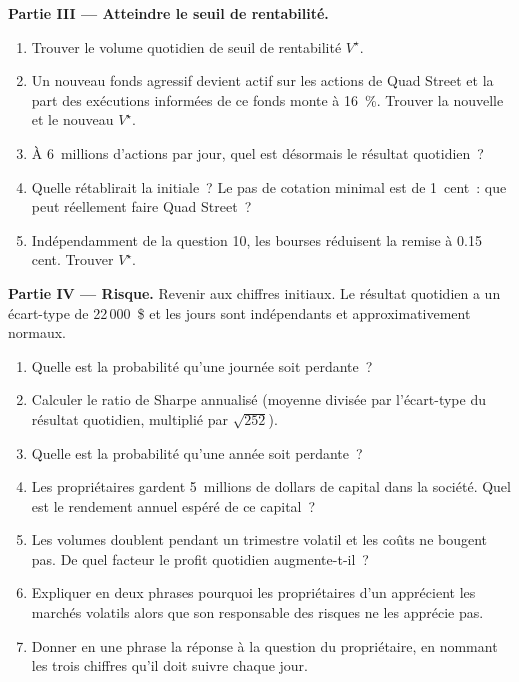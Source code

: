 \begin{problem}
\medskip\noindent\textbf{Partie III --- Atteindre le seuil de rentabilité.}
\begin{enumerate}[resume]
\item Trouver le volume quotidien de seuil de rentabilité $V^\star$.
\item Un nouveau fonds agressif devient actif sur les actions de Quad Street et la
part des exécutions informées de ce fonds monte à 16~\%. Trouver la nouvelle  et le
nouveau $V^\star$.
\item À 6~millions d'actions par jour, quel est désormais le résultat quotidien~?
\item Quelle  rétablirait la  initiale~? Le pas de cotation minimal
est de 1~cent~: que peut réellement faire Quad Street~?
\item Indépendamment de la question 10, les bourses réduisent la remise à 0.15
cent. Trouver $V^\star$.
\end{enumerate}

\medskip\noindent\textbf{Partie IV --- Risque.} Revenir aux chiffres initiaux.
Le résultat quotidien a un écart-type de 22\,000~\$ et les jours sont
indépendants et approximativement normaux.
\begin{enumerate}[resume]
\item Quelle est la probabilité qu'une journée soit perdante~?
\item Calculer le ratio de Sharpe annualisé (moyenne divisée par l'écart-type du
résultat quotidien, multiplié par $\sqrt{252}$).
\item Quelle est la probabilité qu'une année soit perdante~?
\item Les propriétaires gardent 5~millions de dollars de capital dans la société. Quel est le
rendement annuel espéré de ce capital~?
\item Les volumes doublent pendant un trimestre volatil et les coûts ne bougent pas. De quel
facteur le profit quotidien augmente-t-il~?
\item Expliquer en deux phrases pourquoi les propriétaires d'un  apprécient les marchés volatils
alors que son responsable des risques ne les apprécie pas.
\item Donner en une phrase la réponse à la question du propriétaire, en nommant les
trois chiffres qu'il doit suivre chaque jour.
\end{enumerate}
\end{problem}

